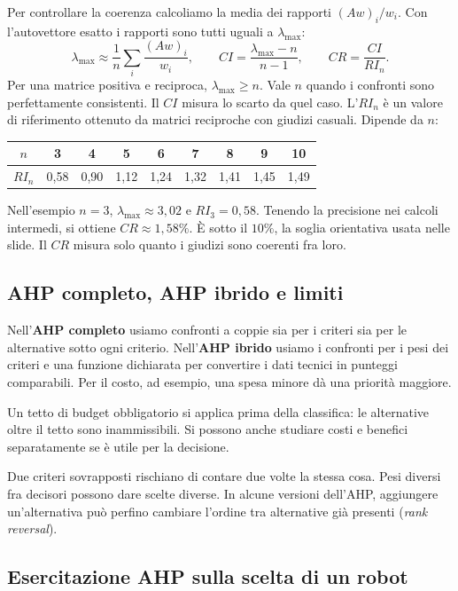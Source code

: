 \noindent Per controllare la coerenza calcoliamo la media dei rapporti
$(Aw)_i/w_i$. Con l'autovettore esatto i rapporti sono tutti uguali
a $\lambda_{\max}$:
\[
    \lambda_{\max}\approx\frac{1}{n}\sum_i\frac{(Aw)_i}{w_i},
    \qquad CI=\frac{\lambda_{\max}-n}{n-1},
    \qquad CR=\frac{CI}{RI_n}.
\]
\noindent Per una matrice positiva e reciproca, $\lambda_{\max}\ge n$.
Vale $n$ quando i confronti sono perfettamente consistenti. Il $CI$
misura lo scarto da quel caso. L'$RI_n$ è un valore di riferimento
ottenuto da matrici reciproche con giudizi casuali. Dipende da $n$:
\begin{center}
    \begin{tabular}{c|cccccccc}
        $n$ & 3 & 4 & 5 & 6 & 7 & 8 & 9 & 10 \\
        \hline
        $RI_n$ & 0,58 & 0,90 & 1,12 & 1,24 & 1,32 & 1,41 & 1,45 & 1,49
    \end{tabular}
\end{center}

\noindent Nell'esempio $n=3$, $\lambda_{\max}\approx 3{,}02$
e $RI_3=0{,}58$. Tenendo la precisione nei calcoli intermedi,
si ottiene $CR\approx1{,}58\%$. È sotto il $10\%$, la soglia
orientativa usata nelle slide. Il $CR$ misura solo quanto
i giudizi sono coerenti fra loro.

\subsection*{AHP completo, AHP ibrido e limiti}

\noindent Nell'\textbf{AHP completo} usiamo confronti a coppie sia per
i criteri sia per le alternative sotto ogni criterio. Nell'\textbf{AHP
ibrido} usiamo i confronti per i pesi dei criteri e una funzione
dichiarata per convertire i dati tecnici in punteggi comparabili.
Per il costo, ad esempio, una spesa minore dà una priorità maggiore.

\noindent Un tetto di budget obbligatorio si applica prima della
classifica: le alternative oltre il tetto sono inammissibili.
Si possono anche studiare costi e benefici separatamente se è utile
per la decisione.

\noindent Due criteri sovrapposti rischiano di contare due volte
la stessa cosa. Pesi diversi fra decisori possono dare scelte diverse.
In alcune versioni dell'AHP, aggiungere un'alternativa può perfino
cambiare l'ordine tra alternative già presenti (\emph{rank reversal}).

\subsection{Esercitazione AHP sulla scelta di un robot}

